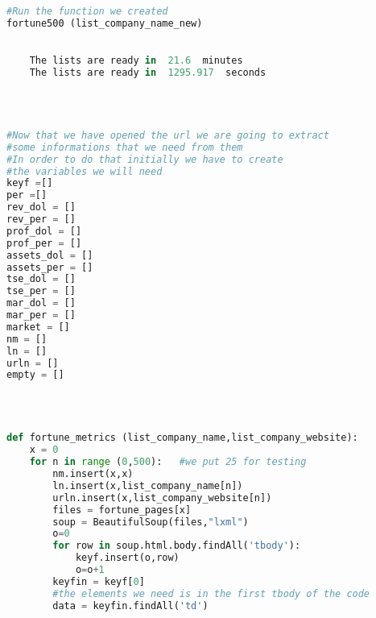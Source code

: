\documentclass{article}
\begin{document}
\begin{lstlisting}[language=Python]
 
#Run the function we created
fortune500 (list_company_name_new)
 

    The lists are ready in  21.6  minutes
    The lists are ready in  1295.917  seconds
    


 
#Now that we have opened the url we are going to extract 
#some informations that we need from them
#In order to do that initially we have to create 
#the variables we will need
keyf =[]
per =[]
rev_dol = []
rev_per = []
prof_dol = []
prof_per = []
assets_dol = []
assets_per = []
tse_dol = []
tse_per = []
mar_dol = []
mar_per = []
market = []
nm = []
ln = []
urln = []
empty = []
 


 
def fortune_metrics (list_company_name,list_company_website):
    x = 0
    for n in range (0,500):   #we put 25 for testing
        nm.insert(x,x)
        ln.insert(x,list_company_name[n])
        urln.insert(x,list_company_website[n])
        files = fortune_pages[x]
        soup = BeautifulSoup(files,"lxml")
        o=0
        for row in soup.html.body.findAll('tbody'):
            keyf.insert(o,row)
            o=o+1
        keyfin = keyf[0] 
        #the elements we need is in the first tbody of the code
        data = keyfin.findAll('td')


\end{lstlisting}
\end{document}
